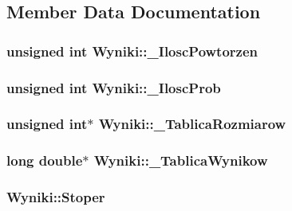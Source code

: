\subsection{Member Data Documentation}
\hypertarget{class_wyniki_ad207dabc5d9f03c957e1d023276f5548}{
\subsubsection[{\-\_\-\-Ilosc\-Powtorzen}]{\setlength{\rightskip}{0pt plus 5cm}unsigned int Wyniki\-::\-\_\-\-Ilosc\-Powtorzen\hspace{0.3cm}{\ttfamily [private]}}}\label{class_wyniki_ad207dabc5d9f03c957e1d023276f5548}
\hypertarget{class_wyniki_ac276b321edb9c38043e2b5aba213d847}{
\subsubsection[{\-\_\-\-Ilosc\-Prob}]{\setlength{\rightskip}{0pt plus 5cm}unsigned int Wyniki\-::\-\_\-\-Ilosc\-Prob\hspace{0.3cm}{\ttfamily [private]}}}\label{class_wyniki_ac276b321edb9c38043e2b5aba213d847}
\hypertarget{class_wyniki_a559a3c3c4374708a493e8636320d9165}{
\subsubsection[{\-\_\-\-Tablica\-Rozmiarow}]{\setlength{\rightskip}{0pt plus 5cm}unsigned int$\ast$ Wyniki\-::\-\_\-\-Tablica\-Rozmiarow\hspace{0.3cm}{\ttfamily [private]}}}\label{class_wyniki_a559a3c3c4374708a493e8636320d9165}
\hypertarget{class_wyniki_a6f47caedb424b964c117252febe1f135}{
\subsubsection[{\-\_\-\-Tablica\-Wynikow}]{\setlength{\rightskip}{0pt plus 5cm}long double$\ast$ Wyniki\-::\-\_\-\-Tablica\-Wynikow\hspace{0.3cm}{\ttfamily [private]}}}\label{class_wyniki_a6f47caedb424b964c117252febe1f135}
\hypertarget{class_wyniki_ac62ede680255427ef8f51e38e3eddcb9}{
\subsubsection[{Stoper}]{ Wyniki\-::\-Stoper\hspace{0.3cm}{\ttfamily [private]}}}\label{class_wyniki_ac62ede680255427ef8f51e38e3eddcb9}


